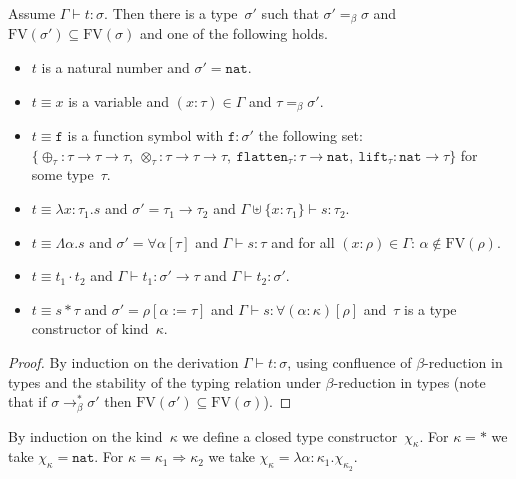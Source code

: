 \documentclass[runningheads,a4paper]{llncs}
\newcommand{\quant}[2]{\forall #1[#2]}
\newcommand{\arrtype}{\rightarrow}
\newcommand{\arrkind}{\Rightarrow}
\newcommand{\abs}[2]{\lambda #1.#2}
\newcommand{\tabs}[2]{\Lambda #1.#2}
\newcommand{\app}[2]{#1 \cdot #2}
\newcommand{\tapp}[2]{#1 * #2}
\newcommand{\subst}[2]{#1:=#2}
\newcommand{\FV}{\mathrm{FV}}
\newcommand{\nat}{\mathtt{nat}}
\newcommand{\flatten}{\mathtt{flatten}}
\newcommand{\lift}{\mathtt{lift}}
\newcommand{\proves}{\vdash}
\begin{document}
\begin{lemma}
  Assume $\Gamma \proves t : \sigma$. Then there is a type~$\sigma'$
  such that $\sigma' =_\beta \sigma$ and $\FV(\sigma') \subseteq
  \FV(\sigma)$ and one of the following holds.
  \begin{itemize}
  \item $t$ is a natural number and $\sigma' = \nat$.
  \item $t \equiv x$ is a variable and $(x : \tau) \in \Gamma$ and $\tau
    =_\beta \sigma'$.
  \item $t \equiv \mathtt{f}$ is a function symbol with $\mathtt{f} :
    \sigma'$ the following set: $\{ \oplus_{\tau} : \tau \arrtype \tau
    \arrtype \tau,\ \otimes_{\tau} : \tau \arrtype \tau \arrtype
    \tau,\ \flatten_{\tau} : \tau \arrtype \nat,\ \lift_{\tau} : \nat
    \arrtype \tau \}$ for some type~$\tau$.
  \item $t \equiv \abs{x:\tau_1}{s}$ and
    $\sigma'=\tau_1\arrtype\tau_2$ and $\Gamma \uplus \{ x : \tau_1 \}
    \vdash s : \tau_2$.
  \item $t \equiv \tabs{\alpha}{s}$ and $\sigma' =
    \quant{\alpha}{\tau}$ and $\Gamma \vdash s : \tau$ and for all $(x
    : \rho) \in \Gamma$: $\alpha \notin \FV(\rho)$.
  \item $t \equiv \app{t_1}{t_2}$ and $\Gamma \vdash t_1 :
    \sigma' \arrtype \tau$ and $\Gamma \vdash t_2 : \sigma'$.
  \item $t \equiv \tapp{s}{\tau}$ and $\sigma' =
    \rho[\subst{\alpha}{\tau}]$ and $\Gamma \vdash s :
    \quant{(\alpha:\kappa)}{\rho}$ and~$\tau$ is a type constructor of
    kind~$\kappa$.
  \end{itemize}
\end{lemma}

\begin{proof}
  By induction on the derivation $\Gamma \proves t : \sigma$, using
  confluence of $\beta$-reduction in types and the stability of the
  typing relation under $\beta$-reduction in types (note that if
  $\sigma \to^*_\beta \sigma'$ then $\FV(\sigma') \subseteq
  \FV(\sigma)$).
\end{proof}

\begin{definition}\label{def_chi_kappa}\normalfont
  By induction on the kind~$\kappa$ we define a closed type
  constructor~$\chi_\kappa$. For $\kappa=*$ we take $\chi_\kappa =
  \nat$. For $\kappa=\kappa_1\arrkind\kappa_2$ we take $\chi_\kappa =
  \lambda \alpha:\kappa_1 . \chi_{\kappa_2}$.
\end{definition}
\end{document}
